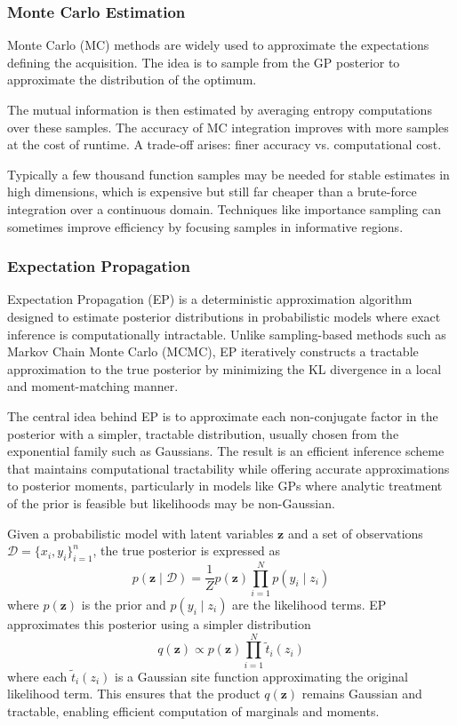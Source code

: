 \documentclass{ut-thesis}
\begin{document}
\subsubsection{Monte Carlo Estimation}

Monte Carlo (MC) methods are widely used to approximate the expectations defining the acquisition. The idea is to sample from the GP posterior to approximate the distribution of the optimum\cite{robert2004monte}. 

The mutual information is then estimated by averaging entropy computations over these samples. The accuracy of MC integration improves with more samples at the cost of runtime. A trade-off arises: finer accuracy vs. computational cost. 

Typically a few thousand function samples may be needed for stable estimates in high dimensions, which is expensive but still far cheaper than a brute-force integration over a continuous domain. Techniques like importance sampling can sometimes improve efficiency by focusing samples in informative regions.

\subsubsection{Expectation Propagation}

Expectation Propagation (EP) is a deterministic approximation algorithm designed to estimate posterior distributions in probabilistic models where exact inference is computationally intractable\cite{minka2001expectation}. Unlike sampling-based methods such as Markov Chain Monte Carlo (MCMC), EP iteratively constructs a tractable approximation to the true posterior by minimizing the KL divergence in a local and moment-matching manner. 

The central idea behind EP is to approximate each non-conjugate factor in the posterior with a simpler, tractable distribution, usually chosen from the exponential family such as Gaussians. The result is an efficient inference scheme that maintains computational tractability while offering accurate approximations to posterior moments, particularly in models like GPs where analytic treatment of the prior is feasible but likelihoods may be non-Gaussian.

Given a probabilistic model with latent variables $\mathbf{z}$ and a set of observations $\mathcal{D} = \{x_i, y_i\}_{i=1}^n$, the true posterior is expressed as
\begin{equation}
    p(\mathbf{z} \mid \mathcal{D}) = \frac{1}{Z} p(\mathbf{z}) \prod_{i=1}^N p(y_i \mid z_i)
\end{equation}
where $p(\mathbf{z})$ is the prior and $p(y_i \mid z_i)$ are the likelihood terms. EP approximates this posterior using a simpler distribution
\begin{equation}
    q(\mathbf{z}) \propto p(\mathbf{z}) \prod_{i=1}^N \tilde{t}_i(z_i)
\end{equation}
where each $\tilde{t}_i(z_i)$ is a Gaussian site function approximating the original likelihood term. This ensures that the product $q(\mathbf{z})$ remains Gaussian and tractable, enabling efficient computation of marginals and moments.
\end{document}
